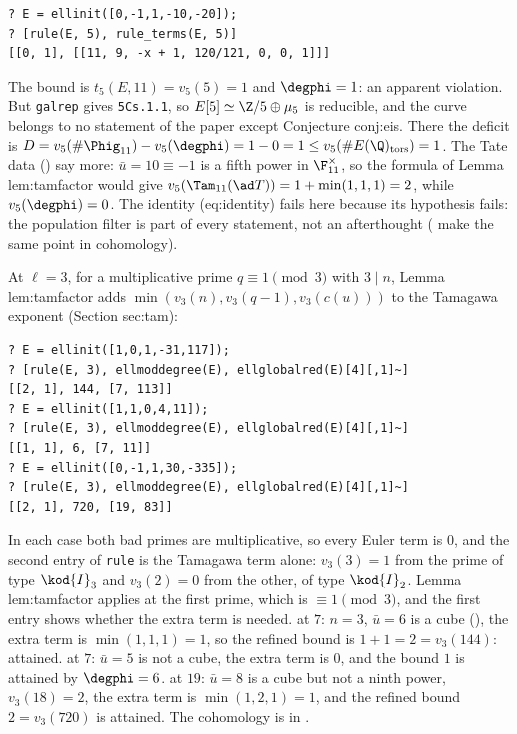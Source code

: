 \begin{sloppypar}
\begin{example}\label{ex:computation:11a1-eisenstein}
\begin{lstlisting}[language=GP]
? E = ellinit([0,-1,1,-10,-20]);
? [rule(E, 5), rule_terms(E, 5)]
[[0, 1], [[11, 9, -x + 1, 120/121, 0, 0, 1]]]
\end{lstlisting}
The bound is $t_5(E,11)=v_5(5)=1$ and $\degphi=1$: an apparent violation. But \texttt{galrep} gives \texttt{5Cs.1.1}, so $E[5]\simeq\Z/5\oplus\mu_5$ is reducible, and
the curve belongs to no statement of the paper except Conjecture conj:eis. There the deficit is $D=v_5(\#\Phig_{11})-v_5(\degphi)=1-0=1\le v_5(\#E(\Q)_{\mathrm{tors}})=1$.
The Tate data () say more: $\bar u=10\equiv-1$ is a fifth power in $\F_{11}^\times$, so the formula of Lemma lem:tamfactor would give
$v_5(\Tam_{11}(\ad T))=1+\min(1,1,1)=2$, while $v_5(\degphi)=0$. The identity (eq:identity) fails here because its hypothesis fails: the population filter is
part of every statement, not an afterthought ( make the same point in cohomology).
\end{example}

\begin{example}\label{ex:computation:tamagawa-session}
At $\ell=3$, for a multiplicative prime $q\equiv1\pmod3$ with $3\mid n$, Lemma lem:tamfactor adds $\min(v_3(n),v_3(q-1),v_3(c(u)))$ to the Tamagawa
exponent (Section sec:tam):
\begin{lstlisting}[language=GP]
? E = ellinit([1,0,1,-31,117]);
? [rule(E, 3), ellmoddegree(E), ellglobalred(E)[4][,1]~]
[[2, 1], 144, [7, 113]]
? E = ellinit([1,1,0,4,11]);
? [rule(E, 3), ellmoddegree(E), ellglobalred(E)[4][,1]~]
[[1, 1], 6, [7, 11]]
? E = ellinit([0,-1,1,30,-335]);
? [rule(E, 3), ellmoddegree(E), ellglobalred(E)[4][,1]~]
[[2, 1], 720, [19, 83]]
\end{lstlisting}
In each case both bad primes are multiplicative, so every Euler term is $0$, and the second entry of \texttt{rule} is the Tamagawa term alone:
$v_3(3)=1$ from the prime of type $\kod{I}_3$ and $v_3(2)=0$ from the other, of type $\kod{I}_2$. Lemma lem:tamfactor applies at the first prime, which is
$\equiv1\pmod3$, and the first entry shows whether the extra term is needed.
 at $7$: $n=3$, $\bar u=6$ is a cube (), the extra term is $\min(1,1,1)=1$, so the refined bound is $1+1=2=v_3(144)$:
attained.  at $7$: $\bar u=5$ is not a cube, the extra term is $0$, and the bound $1$ is attained by $\degphi=6$.  at $19$: $\bar u=8$ is a
cube but not a ninth power, $v_3(18)=2$, the extra term is $\min(1,2,1)=1$, and the refined bound $2=v_3(720)$ is attained. The cohomology is in
.
\end{example}

\end{sloppypar}
